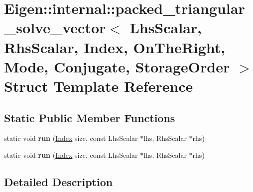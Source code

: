 \hypertarget{struct_eigen_1_1internal_1_1packed__triangular__solve__vector_3_01_lhs_scalar_00_01_rhs_scalar_0f79f386eb54adb50749a71b7ad7957d9}{}\section{Eigen\+:\+:internal\+:\+:packed\+\_\+triangular\+\_\+solve\+\_\+vector$<$ Lhs\+Scalar, Rhs\+Scalar, Index, On\+The\+Right, Mode, Conjugate, Storage\+Order $>$ Struct Template Reference}
\label{struct_eigen_1_1internal_1_1packed__triangular__solve__vector_3_01_lhs_scalar_00_01_rhs_scalar_0f79f386eb54adb50749a71b7ad7957d9}
\subsection*{Static Public Member Functions}
\begin{DoxyCompactItemize}
\item 
\mbox{\label{struct_eigen_1_1internal_1_1packed__triangular__solve__vector_3_01_lhs_scalar_00_01_rhs_scalar_0f79f386eb54adb50749a71b7ad7957d9_a23109756a9073977b9b7b2f02dfd34c6}} 
static void {\bfseries run} (\hyperlink{namespace_eigen_a62e77e0933482dafde8fe197d9a2cfde}{Index} size, const Lhs\+Scalar $\ast$lhs, Rhs\+Scalar $\ast$rhs)
\item 
\mbox{\label{struct_eigen_1_1internal_1_1packed__triangular__solve__vector_3_01_lhs_scalar_00_01_rhs_scalar_0f79f386eb54adb50749a71b7ad7957d9_a23109756a9073977b9b7b2f02dfd34c6}} 
static void {\bfseries run} (\hyperlink{namespace_eigen_a62e77e0933482dafde8fe197d9a2cfde}{Index} size, const Lhs\+Scalar $\ast$lhs, Rhs\+Scalar $\ast$rhs)
\end{DoxyCompactItemize}


\subsection{Detailed Description}
